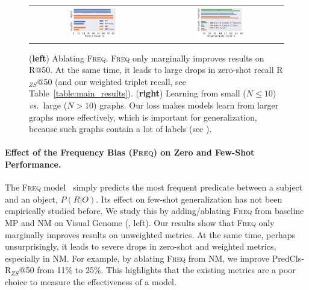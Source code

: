 \begin{figure}
	\centering
	\begin{tabular}{cc}
	\includegraphics[width=0.4\textwidth,align=c,trim={0.2cm 0 0 0},clip]{freq_bias_vs_ZS.pdf}
	& 
	\includegraphics[width=0.4\textwidth,align=c,trim={0.2cm 0 0 0},clip]{large_graphs_vs_loss_norm.pdf}
	\end{tabular}
	\caption{\small (\textbf{left}) Ablating \textsc{Freq}. \textsc{Freq} only marginally improves results on R@50. At the same time, it leads to large drops in zero-shot recall R$_{ZS}$@50 (and our weighted triplet recall, see Table~\ref{table:main_results}). (\textbf{right}) Learning from small ($N \leq 10$) \textit{vs.}~large ($N>10$) graphs. Our loss makes models learn from larger graphs more effectively, which is important for generalization, because such graphs contain a lot of labels (see \fig{\ref{fig:motivation}}).}\label{fig:freq}
\end{figure}

\vspace{-3pt}
\paragraph{Effect of the Frequency Bias (\textsc{Freq}) on Zero and Few-Shot Performance.}
The \textsc{Freq} model~\citep{zellers2018neural} simply predicts the most frequent predicate between a subject and an object, $P(R|O)$.
Its effect on few-shot generalization has not been empirically studied before. 
We study this by adding/ablating \textsc{Freq} from baseline MP and NM on Visual Genome (\fig{\ref{fig:freq}}, left). Our results show that \textsc{Freq} only marginally improves results on unweighted metrics. At the same time, perhaps unsurprisingly, it leads to severe drops in zero-shot and weighted metrics, especially in NM. For example, by ablating \textsc{Freq} from NM, we improve PredCls-R$_{ZS}$@50 from 11\% to 25\%. This highlights that the existing metrics are a poor choice to measure the effectiveness of a model.

